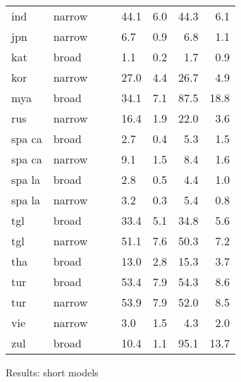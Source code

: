 {\begin{tabularx}{\textwidth}{|l|X||r|r||X|X||r|r|}
ind       & narrow        &        &        & 44.1         & 6.0          & 44.3   & 6.1    \\
jpn       & narrow        &        &        & 6.7          & 0.9          & 6.8    & 1.1        \\
kat       & broad         &        &        & 1.1          & 0.2          & 1.7    & 0.9    \\
kor       & narrow        &        &        & 27.0         & 4.4          & 26.7   & 4.9    \\
mya       & broad         &        &        & 34.1         & 7.1          & 87.5   & 18.8   \\
rus       & narrow        &        &        & 16.4         & 1.9          & 22.0   & 3.6    \\
spa ca    & broad         &        &        & 2.7          & 0.4          & 5.3    & 1.5    \\
spa ca    & narrow        &        &        & 9.1          & 1.5          & 8.4    & 1.6    \\
spa la    & broad         &        &        & 2.8          & 0.5          & 4.4    & 1.0    \\
spa la    & narrow        &        &        & 3.2          & 0.3          & 5.4    & 0.8    \\
tgl       & broad         &        &        & 33.4         & 5.1          & 34.8   & 5.6    \\
tgl       & narrow        &        &        & 51.1         & 7.6          & 50.3   & 7.2    \\
tha       & broad         &        &        & 13.0         & 2.8          & 15.3   & 3.7    \\
tur       & broad         &        &        & 53.4         & 7.9          & 54.3   & 8.6    \\
tur       & narrow        &        &        & 53.9         & 7.9          & 52.0   & 8.5    \\
vie       & narrow        &        &        & 3.0          & 1.5          & 4.3    & 2.0    \\
zul       & broad         &        &        & 10.4         & 1.1          & 95.1   & 13.7   \\ \hline
\end{tabularx}
}{Results: short models}



